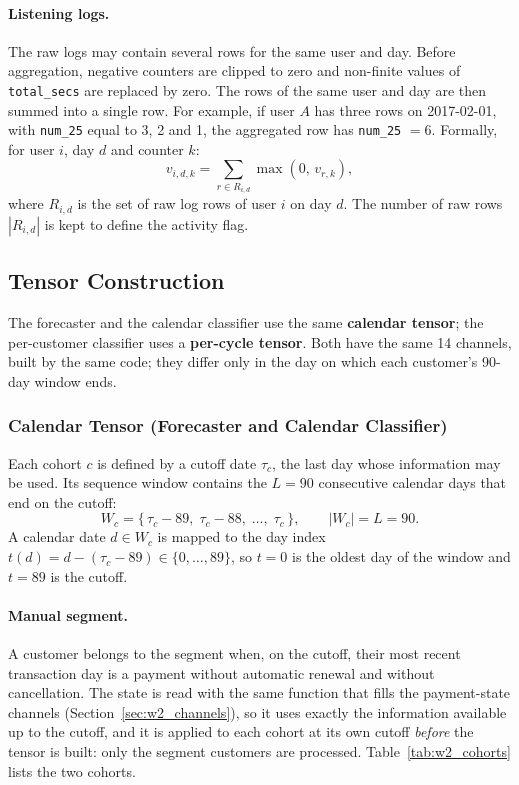 \documentclass{article}
\begin{document}
\paragraph{Listening logs.} The raw logs may contain several rows for the same user and day. Before aggregation, negative counters are clipped to zero and non-finite values of \texttt{total\_secs} are replaced by zero. The rows of the same user and day are then summed into a single row. For example, if user $A$ has three rows on 2017-02-01, with \texttt{num\_25} equal to 3, 2 and 1, the aggregated row has \texttt{num\_25} $= 6$. Formally, for user $i$, day $d$ and counter $k$:
\begin{equation}
v_{i,d,k} = \sum_{r \in R_{i,d}} \max(0,\, v_{r,k}),
\end{equation}
where $R_{i,d}$ is the set of raw log rows of user $i$ on day $d$. The number of raw rows $|R_{i,d}|$ is kept to define the activity flag.

\subsection{Tensor Construction}

The forecaster and the calendar classifier use the same \textbf{calendar tensor}; the per-customer classifier uses a \textbf{per-cycle tensor}. Both have the same 14 channels, built by the same code; they differ only in the day on which each customer's 90-day window ends.

\subsubsection{Calendar Tensor (Forecaster and Calendar Classifier)}

Each cohort $c$ is defined by a cutoff date $\tau_c$, the last day whose information may be used. Its sequence window contains the $L = 90$ consecutive calendar days that end on the cutoff:
\begin{equation}
W_c = \{\, \tau_c - 89,\; \tau_c - 88,\; \dots,\; \tau_c \,\}, \qquad |W_c| = L = 90 .
\end{equation}
A calendar date $d \in W_c$ is mapped to the day index $t(d) = d - (\tau_c - 89) \in \{0, \dots, 89\}$, so $t = 0$ is the oldest day of the window and $t = 89$ is the cutoff.

\paragraph{Manual segment.} A customer belongs to the segment when, on the cutoff, their most recent transaction day is a payment without automatic renewal and without cancellation. The state is read with the same function that fills the payment-state channels (Section~\ref{sec:w2_channels}), so it uses exactly the information available up to the cutoff, and it is applied to each cohort at its own cutoff \emph{before} the tensor is built: only the segment customers are processed. Table~\ref{tab:w2_cohorts} lists the two cohorts.
\end{document}
